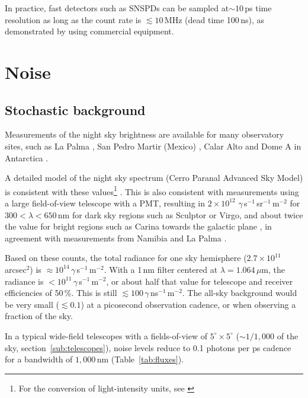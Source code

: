 \documentclass[twocolumn,tighten,longauthor]{myaastex62}
\begin{document}
In practice, fast detectors such as SNSPDs can be sampled at$\sim10\,$ps time resolution as long as the count rate is $\lesssim 10\,$MHz (dead time 100\,ns), as demonstrated by \citet{Shcheslavskiy2016} using commercial equipment.


\section{Noise}


\subsection{Stochastic background}
\label{sub:atmo_noise}
Measurements of the night sky brightness are available for many observatory sites, such as
La Palma \citep[21.9\,mag\,arcsec$^{-2}$ in V-band,][]{1998NewAR..42..503B},
San Pedro Martir (Mexico) \citep[21.84,][]{2017PASP..129c5003P},
Calar Alto \citep[22.01,][]{2007PASP..119.1186S} and
Dome A in Antarctica \citep[23.4,][]{2012PASP..124..637S,2017AJ....154....6Y}.

A detailed model of the night sky spectrum (Cerro Paranal Advanced Sky Model) is consistent with these values\footnote{For the conversion of light-intensity units, see \citet[][Appendix]{1998NewAR..42..503B}} \citep{2012A&A...543A..92N,2013A&A...560A..91J}. This is also consistent with measurements using a large field-of-view telescope with a PMT, resulting in $2\times10^{12}$ $\gamma\,$s$^{-1}$\,sr$^{-1}$\,m$^{-2}$ for $300<\lambda<650\,$nm for dark sky regions such as Sculptor or Virgo, and about twice the value for bright regions such as Carina towards the galactic plane \citep{2011AdSpR..48.1017H}, in agreement with measurements from Namibia \citep{Preu2002} and La Palma \citep{mirzoyan1994measurement}.

Based on these counts, the total radiance for one sky hemisphere ($2.7\times10^{11}\,$arcsec$^2$) is $\approx 10^{14}\,\gamma\,$s$^{-1}\,$m$^{-2}$. With a 1\,nm filter centered at $\lambda=1.064\,\mu$m, the radiance is $<10^{11}\,\gamma\,$s$^{-1}\,$m$^{-2}$, or about half that value for telescope and receiver efficiencies of 50\,\%. This is still $\lesssim100\,\gamma\,$ns$^{-1}\,$m$^{-2}$. The all-sky background would be very small ($\lesssim 0.1$) at a picosecond observation cadence, or when observing a fraction of the sky.

In a typical wide-field telescopes with a fields-of-view of $5^{\circ}\times5^{\circ}$ ($\sim 1/1{,}000$ of the sky, section~\ref{sub:telescopes}), noise levels reduce to 0.1 photons per ps cadence for a bandwidth of $1{,}000\,$nm (Table~\ref{tab:fluxes}).
\end{document}
